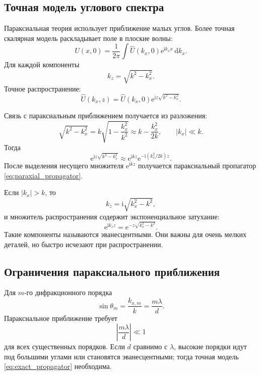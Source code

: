 \documentclass[12pt,a4paper]{article}
\newcommand{\dd}{\,\mathrm{d}}
\newcommand{\ii}{\mathrm{i}}
\newcommand{\e}{\mathrm{e}}
\begin{document}
\subsection{Точная модель углового спектра}

Параксиальная теория использует приближение малых углов. Более точная скалярная модель раскладывает поле в плоские волны:
\begin{equation}
    U(x,0)=\frac{1}{2\pi}\int
    \widehat U(k_x,0)\e^{\ii k_xx}\dd k_x.
\end{equation}
Для каждой компоненты
\begin{equation}
    k_z=\sqrt{k^2-k_x^2}.
\end{equation}
Точное распространение:
\begin{equation}
    \widehat U(k_x,z)=
    \widehat U(k_x,0)
    \e^{\ii z\sqrt{k^2-k_x^2}}.
    \label{eq:exact_propagator}
\end{equation}

Связь с параксиальным приближением получается из разложения:
\begin{equation}
    \sqrt{k^2-k_x^2}
    =
    k\sqrt{1-\frac{k_x^2}{k^2}}
    \approx
    k-\frac{k_x^2}{2k},
    \qquad |k_x|\ll k.
\end{equation}
Тогда
\begin{equation}
    \e^{\ii z\sqrt{k^2-k_x^2}}
    \approx
    \e^{\ii kz}
    \e^{-\ii(k_x^2/2k)z}.
\end{equation}
После выделения несущего множителя $\e^{\ii kz}$ получается параксиальный пропагатор \eqref{eq:paraxial_propagator}.

Если $|k_x|>k$, то
\begin{equation}
    k_z=\ii\sqrt{k_x^2-k^2},
\end{equation}
и множитель распространения содержит экспоненциальное затухание:
\begin{equation}
    \e^{\ii k_zz}=
    \e^{-z\sqrt{k_x^2-k^2}}.
\end{equation}
Такие компоненты называются эванесцентными. Они важны для очень мелких деталей, но быстро исчезают при распространении.

\subsection{Ограничения параксиального приближения}

Для $m$-го дифракционного порядка
\begin{equation}
    \sin\theta_m=\frac{k_{x,m}}{k}=\frac{m\lambda}{d}.
\end{equation}
Параксиальное приближение требует
\begin{equation}
    \left|\frac{m\lambda}{d}\right|\ll 1
\end{equation}
для всех существенных порядков. Если $d$ сравнимо с $\lambda$, высокие порядки идут под большими углами или становятся эванесцентными; тогда точная модель \eqref{eq:exact_propagator} необходима.
\end{document}

